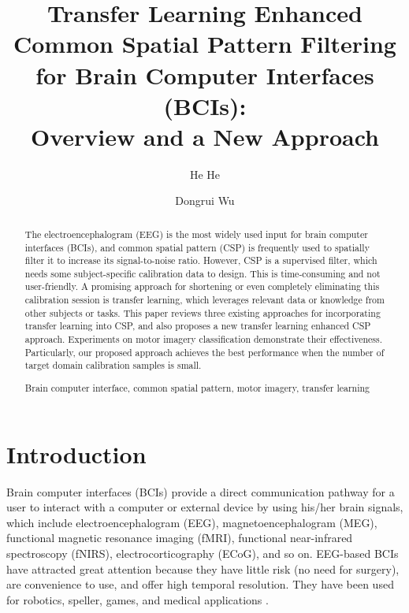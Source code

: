 \documentclass[runningheads]{llncs}
\newcommand{\keywords}[1]{\par\addvspace\baselineskip
\noindent\keywordname\enspace\ignorespaces#1}
\begin{document}
\mainmatter

\title{Transfer Learning Enhanced Common Spatial Pattern Filtering for Brain Computer Interfaces (BCIs):\\ Overview and a New Approach}

\author{He He \and Dongrui Wu}

\maketitle


\begin{abstract}
The electroencephalogram (EEG) is the most widely used input for brain computer interfaces (BCIs), and common spatial pattern (CSP) is frequently used to spatially filter it to increase its signal-to-noise ratio. However, CSP is a supervised filter, which needs some subject-specific calibration data to design. This is time-consuming and not user-friendly. A promising approach for shortening or even completely eliminating this calibration session is transfer learning, which leverages relevant data or knowledge from other subjects or tasks. This paper reviews three existing approaches for incorporating transfer learning into CSP, and also proposes a new transfer learning enhanced CSP approach. Experiments on motor imagery classification demonstrate their effectiveness. Particularly, our proposed approach achieves the best performance when the number of target domain calibration samples is small.

\keywords{Brain computer interface, common spatial pattern, motor imagery, transfer learning}
\end{abstract}


\section{Introduction}

Brain computer interfaces (BCIs) \cite{Wolpaw2002,Lance2012} provide a direct communication pathway for a user to interact with a computer or external device by using his/her brain signals, which include electroencephalogram (EEG), magnetoencephalogram (MEG), functional magnetic resonance imaging (fMRI), functional near-infrared spectroscopy (fNIRS), electrocorticography (ECoG), and so on. EEG-based BCIs have attracted great attention because they have little risk (no need for surgery), are convenience to use, and offer high temporal resolution. They have been used for robotics, speller, games, and medical applications \cite{Nicolas-Alonso2012,Erp2012}.
\end{document}
